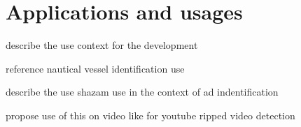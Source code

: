
\chapter{Applications and usages} %

describe the use context for the development

reference nautical vessel identification use

describe the use shazam use in the context of ad indentification

propose use of this on video like for youtube ripped video detection


\ifpdf
    \graphicspath{{X/figures/PNG/}{X/figures/PDF/}{X/figures/}}
\else
    \graphicspath{{X/figures/EPS/}{X/figures/}}
\fi









